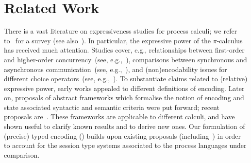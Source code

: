 \section{Related Work}
\label{sec:related}

There is a vast literature on expressiveness studies for process calculi;
we refer to~\cite{DBLP:journals/entcs/Parrow08} for a survey
(see also~\cite[\S\,2.3]{PerezPhD10}). 
In particular, the expressive power of the $\pi$-calculus has received much attention.
Studies cover, e.g., 
relationships between first-order and higher-order concurrency~(see, e.g.,~\cite{San923,San96int}),
comparisons between 
synchronous and asynchronous communication~(see, e.g.,~\cite{Boudol92,Palamidessi03,BeauxisPV08}),
and
(non)encodability issues for different choice operators~(see, e.g.,~\cite{Nestmann00,DBLP:conf/esop/PetersNG13}).
To substantiate claims related to (relative) expressive power,
early works appealed to different definitions of encoding.
Later on, 
proposals of abstract 
frameworks which formalise the notion of encoding 
and state associated syntactic and semantic criteria 
were put forward; 
recent proposals are~\cite{DBLP:journals/iandc/Gorla10,DBLP:journals/tcs/FuL10,DBLP:journals/corr/abs-1208-2750}. 
These frameworks are applicable to different calculi, and 
have shown useful to clarify known results and to derive new ones.
Our formulation of (precise) typed encoding () 
builds upon existing proposals (including~\cite{Palamidessi03,DBLP:journals/iandc/Gorla10,DBLP:conf/icalp/LanesePSS10})
in order to account for the session type systems
associated to the process languages under comparison.


